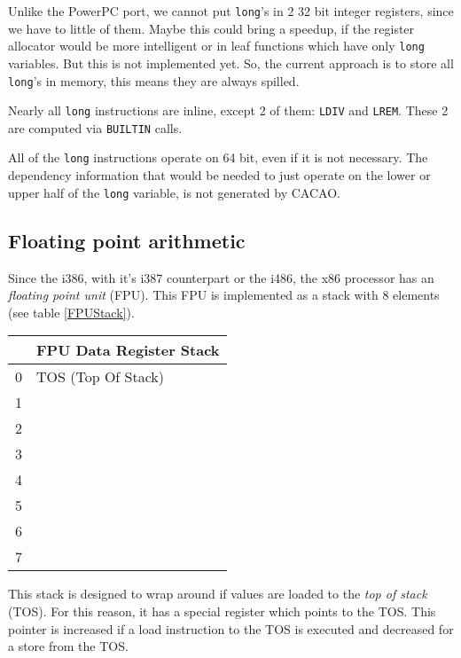 Unlike the PowerPC port, we cannot put \texttt{long}'s in 2 32 bit
integer registers, since we have to little of them. Maybe this could
bring a speedup, if the register allocator would be more intelligent
or in leaf functions which have only \texttt{long} variables. But this
is not implemented yet. So, the current approach is to store all
\texttt{long}'s in memory, this means they are always spilled.

Nearly all \texttt{long} instructions are inline, except 2 of them:
\texttt{LDIV} and \texttt{LREM}. These 2 are computed via
\texttt{BUILTIN} calls.

All of the \texttt{long} instructions operate on 64 bit, even if it is
not necessary. The dependency information that would be needed to just
operate on the lower or upper half of the \texttt{long} variable, is
not generated by CACAO.


\subsection{Floating point arithmetic}

Since the i386, with it's i387 counterpart or the i486, the x86
processor has an \textit{floating point unit} (FPU). This FPU is
implemented as a stack with 8 elements (see table \ref{FPUStack}).

\begin{table*}
\begin{center}
\begin{tabular}[b]{|l|l|}
\hline 
  & FPU Data Register Stack \\ \hline
0 & TOS (Top Of Stack) \\ \hline
1 & \\ \hline
2 & \\ \hline
3 & \\ \hline
4 & \\ \hline
5 & \\ \hline
6 & \\ \hline
7 & \\ \hline
\end{tabular}
\caption{x87 FPU Data Register Stack}
\label{FPUStack}
\end{center}
\end{table*}

This stack is designed to wrap around if values are loaded to the
\textit{top of stack} (TOS). For this reason, it has a special register which
points to the TOS. This pointer is increased if a load instruction to
the TOS is executed and decreased for a store from the TOS.

